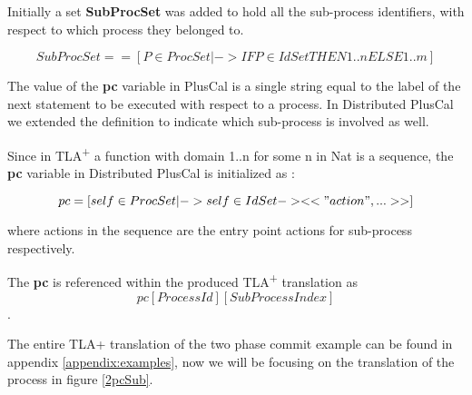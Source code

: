 \documentclass{thesul}
\newcommand{\tlaplus}{TLA\textsuperscript{+}\xspace}
\begin{document}
Initially a set \textbf{SubProcSet} was added to hold all the sub-process identifiers, with respect to which process they belonged to.

\[
SubProcSet == [P \in ProcSet |-> IF P \in IdSet  THEN  1..n
								  ELSE  1..m ]
\]						  

The value of the \textbf{pc} variable in PlusCal is a single string equal to the label of the next statement to be executed with respect to a process. In Distributed PlusCal we extended the definition to indicate which sub-process is involved as well.

Since in \tlaplus a function with domain 1..n for some n in Nat is a sequence, the \textbf{pc} variable in Distributed PlusCal is initialized as :

\[
pc = [self \in ProcSet |-> self \in IdSet -> <<"action",...>>]
\]	

where actions in the sequence are the entry point actions for sub-process respectively. 

The \textbf{pc} is referenced within the produced \tlaplus translation as \[ pc[Process Id][SubProcess Index] \].
		  
The entire TLA+ translation of the two phase commit example can be found in appendix \ref{appendix:examples}, now we will be focusing on the translation of the process in figure \ref{2pcSub}.
\end{document}

